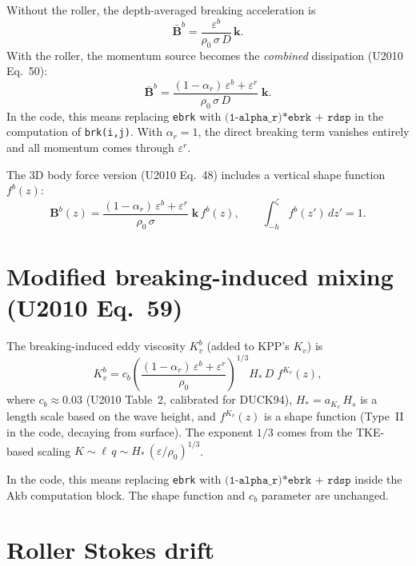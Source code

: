 \documentclass[11pt]{article}
\begin{document}
Without the roller, the depth-averaged breaking acceleration is
\begin{equation}
  \bar{\mathbf{B}}^b = \frac{\varepsilon^b}{\rho_0\,\sigma\,D}\,\mathbf{k}.
  \label{eq:brk_noroller}
\end{equation}
With the roller, the momentum source becomes the \emph{combined}
dissipation (U2010 Eq.~50):
\begin{equation}
  \boxed{
  \bar{\mathbf{B}}^b
  = \frac{(1-\alpha_r)\,\varepsilon^b + \varepsilon^r}
         {\rho_0\,\sigma\,D}\;\mathbf{k}.
  }
  \label{eq:brk_roller}
\end{equation}
In the code, this means replacing \texttt{ebrk} with
$\texttt{(1-alpha\_r)*ebrk + rdsp}$ in the computation of
\texttt{brk(i,j)}. With $\alpha_r=1$, the direct breaking term vanishes
entirely and all momentum comes through $\varepsilon^r$.

The 3D body force version (U2010 Eq.~48) includes a vertical shape
function~$f^b(z)$:
\begin{equation}
  \mathbf{B}^b(z) = \frac{(1-\alpha_r)\,\varepsilon^b + \varepsilon^r}
                         {\rho_0\,\sigma}\;\mathbf{k}\,f^b(z),
  \qquad \int_{-h}^{\zeta} f^b(z')\,dz' = 1.
  \label{eq:brk3d_roller}
\end{equation}

\section{Modified breaking-induced mixing (U2010 Eq.~59)}

The breaking-induced eddy viscosity $K_v^b$ (added to KPP's $K_v$) is
\begin{equation}
  \boxed{
  K_v^b = c_b\left(\frac{(1-\alpha_r)\,\varepsilon^b + \varepsilon^r}
                       {\rho_0}\right)^{\!1/3}\! H_*\,D\;f^{K_v}(z),
  }
  \label{eq:Akb_roller}
\end{equation}
where $c_b \approx 0.03$ (U2010 Table~2, calibrated for DUCK94),
$H_* = a_{K_v}\,H_s$ is a length scale based on the wave height, and
$f^{K_v}(z)$ is a shape function (Type~II in the code, decaying from
surface). The exponent $1/3$ comes from the TKE-based scaling
$K \sim \ell\,q \sim H_*\,({\varepsilon}/{\rho_0})^{1/3}$.

In the code, this means replacing \texttt{ebrk} with
$\texttt{(1-alpha\_r)*ebrk + rdsp}$ inside the Akb computation block.
The shape function and $c_b$ parameter are unchanged.

\section{Roller Stokes drift}
\end{document}
